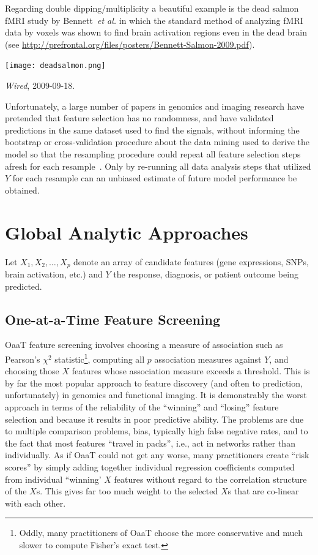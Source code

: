 Regarding double dipping/multiplicity a beautiful example is the dead
salmon fMRI study by Bennett~\emph{et al.} in which the standard
method of analyzing fMRI data by voxels was shown to find brain
activation regions even in the dead brain (see
\url{http://prefrontal.org/files/posters/Bennett-Salmon-2009.pdf}).

\centerline{\texttt{[image: deadsalmon.png]}}

\emph{Wired}, 2009-09-18.

Unfortunately, a large number of papers in genomics and imaging
research have pretended that feature selection has no randomness, and
have validated predictions in the same dataset used to find the signals,
without informing the bootstrap or cross-validation procedure about
the data mining used to derive the model so that the resampling
procedure could repeat all feature selection steps afresh for each
resample~\cite{amb02sel}.  Only by re-running all data analysis steps
that utilized $Y$ for each resample can an unbiased estimate of future
model performance be obtained.

\section{Global Analytic Approaches}
Let $X_{1}, X_{2}, \ldots, X_{p}$ denote an array of candidate features (gene expressions, SNPs, brain activation, etc.) and $Y$ the response, diagnosis, or patient outcome being predicted.

\subsection{One-at-a-Time Feature Screening}
OaaT feature screening involves choosing a measure of association such as Pearson's $\chi^2$ statistic\footnote{Oddly, many practitioners of OaaT choose the more conservative and much slower to compute Fisher's exact test.}, computing all $p$ association measures against $Y$, and choosing those $X$ features whose association measure exceeds a threshold.   
This is by far the most popular approach to feature discovery (and often to prediction, unfortunately) in genomics and functional imaging.  It is demonstrably the worst approach in terms of the reliability of the ``winning'' and ``losing'' feature selection and because it results in poor predictive ability.  The problems are due to multiple comparison problems, bias, typically high false negative rates, and to the fact that most features ``travel in packs'', i.e., act in networks rather than individually.  As if OaaT could not get any worse, many practitioners create ``risk scores'' by simply adding together individual regression coefficients computed from individual ``winning' $X$ features without regard to the correlation structure of the $X$s.  This gives far too much weight to the selected $X$s that are co-linear with each other.

